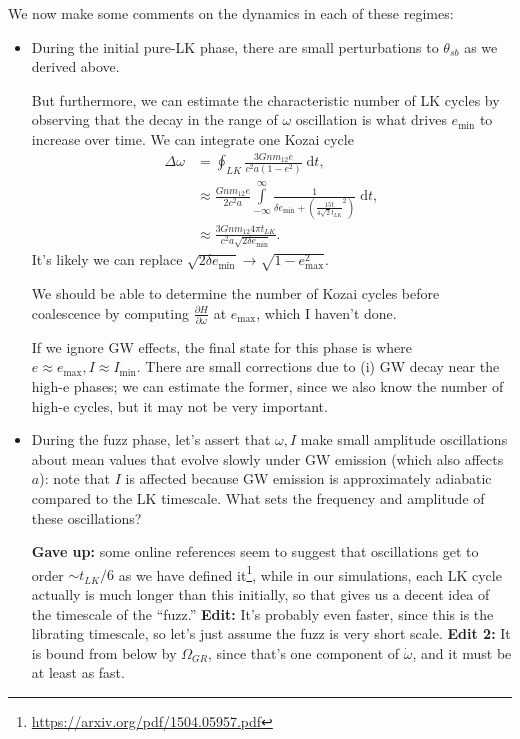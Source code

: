 \documentclass[11pt,
        usenames, %
        dvipsnames %
    ]{article}
\newcommand*{\pd}[2]{\frac{\partial#1}{\partial#2}}
\newcommand*{\p}[1]{\left(#1\right)}
\begin{document}
We now make some comments on the dynamics in each of these regimes:
\begin{itemize}
    \item During the initial pure-LK phase, there are small perturbations to
        $\theta_{sb}$ as we derived above.

        But furthermore, we can estimate the characteristic number of LK cycles
        by observing that the decay in the range of $\omega$ oscillation is what
        drives $e_{\min}$ to increase over time. We can integrate one Kozai
        cycle
        \begin{align}
            \Delta \omega &= \oint_{LK} \frac{3Gnm_{12}e}{c^2a\p{1 - e^2}}
                \;\mathrm{d}t,\\
            &\approx \frac{Gnm_{12}e}{2c^2a}
                \int\limits_{-\infty}^\infty \frac{1}{\delta e_{\min}
                    + \p{\frac{15 t}{4\sqrt{2}t_{LK}}^2}}\;\mathrm{d}t,\\
            &\approx \frac{3Gnm_{12} 4\pi t_{LK}}{c^2a\sqrt{2\delta e_{\min}}}.
        \end{align}
        It's likely we can replace $\sqrt{2 \delta e_{\min}} \to \sqrt{1 -
        e_{\max}^2}$.

        We should be able to determine the number of Kozai cycles before
        coalescence by computing $\pd{H}{\omega}$ at $e_{\max}$, which I haven't
        done.

        If we ignore GW effects, the final state for this phase is where $e
        \approx e_{\max}, I \approx I_{\min}$. There are small corrections due
        to (i) GW decay near the high-e phases; we can estimate the former,
        since we also know the number of high-e cycles, but it may not be very
        important.

    \item During the fuzz phase, let's assert that $\omega, I$ make small
        amplitude oscillations about mean values that evolve slowly under GW
        emission (which also affects $a$): note that $I$ is affected because
        GW emission is approximately adiabatic compared to the LK timescale.
        What sets the frequency and amplitude of these oscillations?

        \textbf{Gave up:} some online references seem to suggest that
        oscillations get to order $\sim t_{LK} / 6$ as we have defined
        it\footnote{\url{https://arxiv.org/pdf/1504.05957.pdf}}, while in our
        simulations, each LK cycle actually is much longer than this initially,
        so that gives us a decent idea of the timescale of the ``fuzz.''
        \textbf{Edit:} It's probably even faster, since this is the librating
        timescale, so let's just assume the fuzz is very short scale.
        \textbf{Edit 2:} It is bound from below by $\Omega_{GR}$, since that's
        one component of $\dot{\omega}$, and it must be at least as fast.


\end{itemize}
\end{document}

